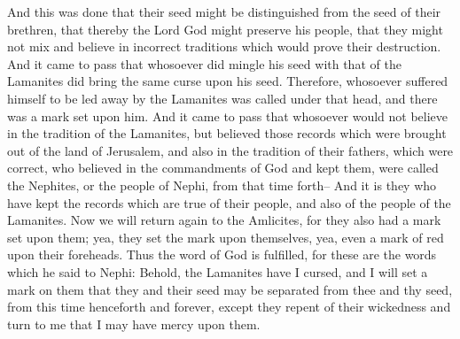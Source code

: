 And this was done that their seed might be distinguished from the seed of their brethren, that thereby the Lord God might preserve his people, that they might not mix and believe in incorrect traditions which would prove their destruction.
\bverse \iffalse And it came to pass that whosoever did mingle his seed with that of the Lamanites did bring the same curse upon his seed. \fi
And it came to pass that whosoever did mingle his seed with that of the Lamanites did bring the same curse upon his seed.
\bverse \iffalse Therefore, whosoever suffered himself to be led away by the Lamanites was called under that head, and there was a mark set upon him. \fi
Therefore, whosoever suffered himself to be led away by the Lamanites was called under that head, and there was a mark set upon him.
\bverse \iffalse And it came to pass that whosoever would not believe in the tradition of the Lamanites, but believed those records which were brought out of the land of Jerusalem, and also in the tradition of their fathers, which were correct, who believed in the commandments of God and kept them, were called the Nephites, or the people of Nephi, from that time forth-- \fi
And it came to pass that whosoever would not believe in the tradition of the Lamanites, but believed those records which were brought out of the land of Jerusalem, and also in the tradition of their fathers, which were correct, who believed in the commandments of God and kept them, were called the Nephites, or the people of Nephi, from that time forth--
\bverse \iffalse And it is they who have kept the records which are true of their people, and also of the people of the Lamanites. \fi
And it is they who have kept the records which are true of their people, and also of the people of the Lamanites.
\bverse \iffalse Now we will return again to the Amlicites, for they also had a mark set upon them; yea, they set the mark upon themselves, yea, even a mark of red upon their foreheads. \fi
Now we will return again to the Amlicites, for they also had a mark set upon them; yea, they set the mark upon themselves, yea, even a mark of red upon their foreheads.
\bverse \iffalse Thus the word of God is fulfilled, for these are the words which he said to Nephi: Behold, the Lamanites have I cursed, and I will set a mark on them that they and their seed may be separated from thee and thy seed, from this time henceforth and forever, except they repent of their wickedness and turn to me that I may have mercy upon them. \fi
Thus the word of God is fulfilled, for these are the words which he said to Nephi: Behold, the Lamanites have I cursed, and I will set a mark on them that they and their seed may be separated from thee and thy seed, from this time henceforth and forever, except they repent of their wickedness and turn to me that I may have mercy upon them.
